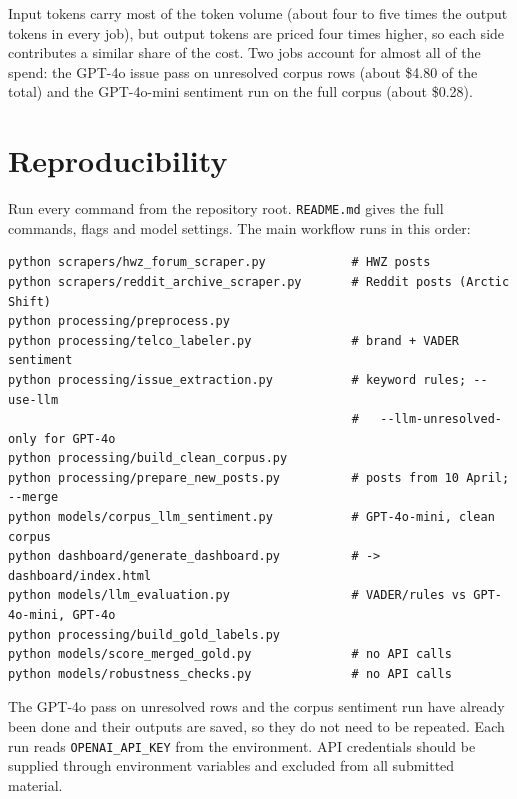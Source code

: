 \documentclass[11pt,a4paper]{article}
\begin{document}
Input tokens carry most of the token volume (about four to five times the output tokens in every job), but output tokens are priced four times higher, so each side contributes a similar share of the cost. Two jobs account for almost all of the spend: the GPT-4o issue pass on unresolved corpus rows (about \$4.80 of the total) and the GPT-4o-mini sentiment run on the full corpus (about \$0.28).

\section{Reproducibility}

Run every command from the repository root. \texttt{README.md} gives the full commands, flags and model settings. The main workflow runs in this order:

\begin{verbatim}
python scrapers/hwz_forum_scraper.py            # HWZ posts
python scrapers/reddit_archive_scraper.py       # Reddit posts (Arctic Shift)
python processing/preprocess.py
python processing/telco_labeler.py              # brand + VADER sentiment
python processing/issue_extraction.py           # keyword rules; --use-llm
                                                #   --llm-unresolved-only for GPT-4o
python processing/build_clean_corpus.py
python processing/prepare_new_posts.py          # posts from 10 April; --merge
python models/corpus_llm_sentiment.py           # GPT-4o-mini, clean corpus
python dashboard/generate_dashboard.py          # -> dashboard/index.html
python models/llm_evaluation.py                 # VADER/rules vs GPT-4o-mini, GPT-4o
python processing/build_gold_labels.py
python models/score_merged_gold.py              # no API calls
python models/robustness_checks.py              # no API calls
\end{verbatim}

The GPT-4o pass on unresolved rows and the corpus sentiment run have already been done and their outputs are saved, so they do not need to be repeated. Each run reads \texttt{OPENAI\_API\_KEY} from the environment. API credentials should be supplied through environment variables and excluded from all submitted material.
\end{document}
